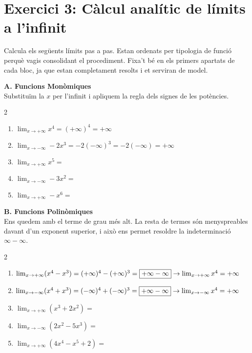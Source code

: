 \documentclass[12pt,a4paper]{article}
\begin{document}
\newpage
\section*{Exercici 3: Càlcul analític de límits a l'infinit}

Calcula els següents límits pas a pas. Estan ordenats per tipologia de funció perquè vagis consolidant el procediment. Fixa't bé en els primers apartats de cada bloc, ja que estan completament resolts i et serviran de model.

\vspace{0.5cm}

\textbf{A. Funcions Monòmiques} \\
Substituïm la $x$ per l'infinit i apliquem la regla dels signes de les potències.
\vspace{-0.2cm}
\begin{multicols}{2}
\begin{enumerate}[label=\textbf{\arabic*.}, itemsep=0.8cm]
    \item $\lim_{x \to +\infty} x^4 = (+\infty)^4 = \mathbf{+\infty}$
    \item $\lim_{x \to -\infty} -2x^3 = -2(-\infty)^3 = -2(-\infty) = \mathbf{+\infty}$
    \item $\lim_{x \to +\infty} x^5 =$
    \item $\lim_{x \to -\infty} -3x^2 =$
    \item $\lim_{x \to +\infty} -x^6 =$
\end{enumerate}
\end{multicols}

\vspace{0.5cm}

\textbf{B. Funcions Polinòmiques} \\
Ens quedem amb el terme de grau més alt. La resta de termes són menyspreables davant d'un exponent superior, i això ens permet resoldre la indeterminació $\infty - \infty$.
\vspace{-0.2cm}
\begin{multicols}{2}
\begin{enumerate}[label=\textbf{\arabic*.}, resume, itemsep=0.8cm]
    \item $\lim_{x \to +\infty} (x^4 - x^3) = (+\infty)^4 - (+\infty)^3 = \fbox{$+\infty - \infty$} \rightarrow \lim_{x\to +\infty} x^4 = \mathbf{+\infty}$
    \item $\lim_{x \to -\infty} (x^4 + x^3) = (-\infty)^4 + (-\infty)^3 = \fbox{$+\infty - \infty$} \rightarrow \lim_{x\to -\infty} x^4 = \mathbf{+\infty}$
    \item $\lim_{x \to +\infty} (x^3 + 2x^2) =$
    \item $\lim_{x \to -\infty} (2x^2 - 5x^3) =$
    \item $\lim_{x \to +\infty} (4x^4 - x^5 + 2) =$
\end{enumerate}
\end{multicols}
\end{document}
